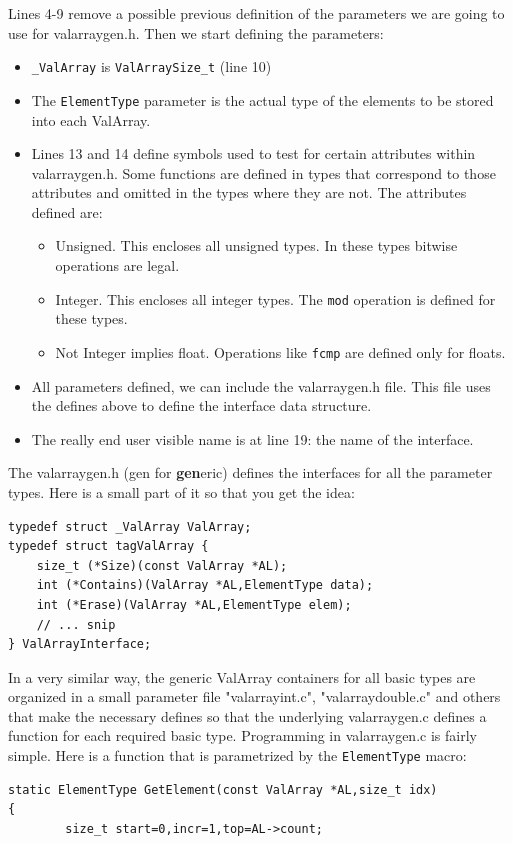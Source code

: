 \documentclass[12pt,a4paper]{memoir} %
\begin{document}
{{\begin{verbatim}
\end{verbatim}
Lines 4-9 remove a possible previous definition of the parameters we are going to use for valarraygen.h. Then we start defining the parameters:
\begin{itemize}
\item \verb,_ValArray, is \verb,ValArraySize_t, (line 10)
\item The \verb,ElementType, parameter is the actual type of the elements to be stored into each ValArray.
\item Lines 13 and 14 define symbols used to test for certain attributes within valarraygen.h. Some functions are defined in types that 
correspond to those attributes and omitted in the types where they are not. The attributes defined are:
\begin{itemize}
\item Unsigned. This encloses all unsigned types. In these types bitwise operations are legal.
\item Integer. This encloses all integer types. The \verb,mod, operation is defined for these types.
\item Not Integer implies float. Operations like \verb,fcmp, are defined only for floats.
\end{itemize}
\item All parameters defined, we can include the valarraygen.h file. This file uses the defines above to define the interface data structure.
\item The really end user visible name is at line 19: the name of the interface. 
\end{itemize}
The valarraygen.h (gen for \textbf{gen}eric) defines the interfaces for all the parameter types.
Here is a small part of it so that you get the idea:
\begin{verbatim}
typedef struct _ValArray ValArray;
typedef struct tagValArray {
    size_t (*Size)(const ValArray *AL);
    int (*Contains)(ValArray *AL,ElementType data);
    int (*Erase)(ValArray *AL,ElementType elem);
    // ... snip
} ValArrayInterface;
\end{verbatim}
In a very similar way, the generic ValArray containers for all basic types are organized in a small parameter file "valarrayint.c", "valarraydouble.c"
and others that make the necessary defines so that the underlying valarraygen.c defines a function for each required basic type.
Programming in valarraygen.c is fairly simple. Here is a function that is parametrized by the \texttt{ElementType} macro:
\begin{verbatim}
static ElementType GetElement(const ValArray *AL,size_t idx)
{
        size_t start=0,incr=1,top=AL->count;


\end{verbatim}}}
\end{document}
